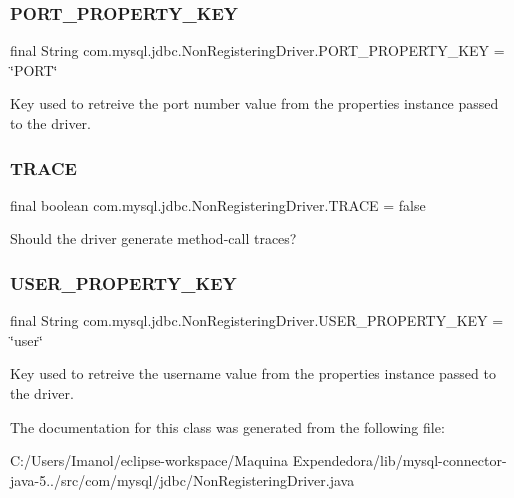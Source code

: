 \subsubsection{\texorpdfstring{P\+O\+R\+T\+\_\+\+P\+R\+O\+P\+E\+R\+T\+Y\+\_\+\+K\+EY}{PORT\_PROPERTY\_KEY}}
{\footnotesize\ttfamily final String com.\+mysql.\+jdbc.\+Non\+Registering\+Driver.\+P\+O\+R\+T\+\_\+\+P\+R\+O\+P\+E\+R\+T\+Y\+\_\+\+K\+EY = \char`\"{}P\+O\+RT\char`\"{}\hspace{0.3cm}{\ttfamily [static]}}

Key used to retreive the port number value from the properties instance passed to the driver. \mbox{\label{classcom_1_1mysql_1_1jdbc_1_1_non_registering_driver_ad02b7e726a4bb40575dd1dc18fa836a6}} 
\subsubsection{\texorpdfstring{T\+R\+A\+CE}{TRACE}}
{\footnotesize\ttfamily final boolean com.\+mysql.\+jdbc.\+Non\+Registering\+Driver.\+T\+R\+A\+CE = false\hspace{0.3cm}{\ttfamily [static]}}

Should the driver generate method-\/call traces? \mbox{\label{classcom_1_1mysql_1_1jdbc_1_1_non_registering_driver_aac9ec3832a08f0712f3527cbcaa025a4}} 
\subsubsection{\texorpdfstring{U\+S\+E\+R\+\_\+\+P\+R\+O\+P\+E\+R\+T\+Y\+\_\+\+K\+EY}{USER\_PROPERTY\_KEY}}
{\footnotesize\ttfamily final String com.\+mysql.\+jdbc.\+Non\+Registering\+Driver.\+U\+S\+E\+R\+\_\+\+P\+R\+O\+P\+E\+R\+T\+Y\+\_\+\+K\+EY = \char`\"{}user\char`\"{}\hspace{0.3cm}{\ttfamily [static]}}

Key used to retreive the username value from the properties instance passed to the driver. 

The documentation for this class was generated from the following file\+:\begin{DoxyCompactItemize}
\item 
C\+:/\+Users/\+Imanol/eclipse-\/workspace/\+Maquina Expendedora/lib/mysql-\/connector-\/java-\/5../src/com/mysql/jdbc/Non\+Registering\+Driver.\+java\end{DoxyCompactItemize}

